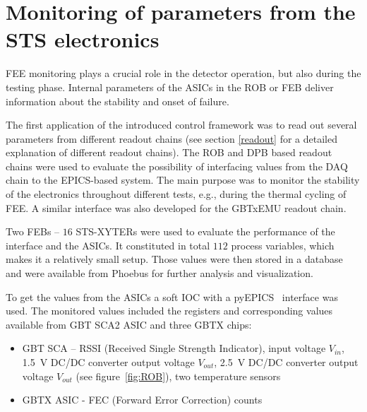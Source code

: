 
\section{Monitoring of parameters from the STS electronics}

\gls{FEE} monitoring plays a crucial role in the detector operation, but also during the testing phase. Internal parameters of the \glspl{ASIC} in the \gls{ROB} or \gls{FEB} deliver information about the stability and onset of failure.


The first application of the introduced control framework was to read out several parameters from different readout chains (see section \ref{readout} for a detailed explanation of different readout chains). The \gls{ROB} and \gls{DPB} based readout chains were used to evaluate the possibility of interfacing values from the \gls{DAQ} chain to the \gls{EPICS}-based system. The main purpose was to monitor the stability of the electronics throughout different tests, e.g., during the thermal cycling of \gls{FEE}. A similar interface was also developed for the GBTxEMU readout chain. 

Two \glspl{FEB} -- $16$ STS-XYTERs were used to evaluate the performance of the interface and the ASICs. It constituted in total $112$ process variables, which makes it a relatively small setup. Those values were then stored in a database and were available from Phoebus for further analysis and visualization.

To get the values from the \glspl{ASIC} a soft \gls{IOC} with a pyEPICS~\cite{pyEPICS} interface was used. The monitored values included the registers and corresponding values available from \gls{GBT} \gls{SCA2} \gls{ASIC} \cite{GBT_SCA_ASIC} and three GBTX chips: 
\begin{itemize}
    \item GBT SCA -- RSSI (Received Single Strength Indicator), input voltage $V_{in}$, \SI{1.5}{\volt} DC/DC converter output voltage $V_{out}$, \SI{2.5}{\volt} DC/DC converter output voltage $V_{out}$ (see figure~\ref{fig:ROB}), two temperature sensors
    \item GBTX \gls{ASIC} - FEC (Forward Error Correction) counts
\end{itemize}

